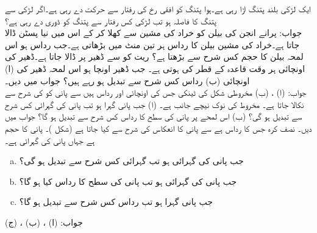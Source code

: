 ایک لڑکی  بلند پتنگ اڑا رہی ہے۔ہوا پتنگ کو افقی رخ  کی رفتار سے حرکت دے رہی ہے۔اگر لڑکی سے پتنگ کا فاصلہ  ہو تب لڑکی کس رفتار سے پتنگ کو ڈوری دے رہی ہے؟ \\
جواب:\quad {}
پرانے انجن کی بیلن کو خراد کی مشین سے کھلا کر کے اس میں نیا پسٹن ڈالا جاتا ہے۔خراد کی مشین بیلن کا رداس ہر تین منٹ میں  بڑھاتی ہے۔جب رداس  ہو اس لمحہ بیلن کا حجم کس شرح سے بڑھتا ہے؟
ریت کو  سے  ڈھیر  پر ڈالا جاتا ہے۔ڈھیر کی اونچائی ہر وقت قاعدہ کے قطر کی  ہوتی ہے۔ جب ڈھیر  اونچا ہو اس لمحہ ڈھیر کی (ا) اونچائی (ب) رداس کس شرح سے تبدیل ہو رہے ہیں؟  جواب  میں دیں۔ \\
جواب:\quad
(ا) ، (ب) 
مخروطی شکل کی ٹینکی جس کی اونچائی  اور رداس  ہیں سے پانی  کو  کی شرح سے نکالا جاتا ہے۔ مخروط کی نوک نیچے جانب ہے۔ (ا) جب پانی  گہرا ہو تب پانی کی گہرائی کس شرح سے تبدیل ہو گی؟ (ب) اس لمحے پر پانی کی سطح کا رداس کس شرح سے تبدیل ہو گا؟ جواب  میں دیں۔
نصف کرہ جس کا رداس  ہے سے پانی کا انعکاس  کی  شرح سے کیا جاتا ہے (شکل )۔ پانی کا حجم  ہے جہاں  پانی کی گہرائی ہے۔
%
\begin{enumerate}[a.]
\item
جب پانی کی گہرائی  ہو تب گہرائی کس شرح سے تبدیل ہو گی؟
\item
جب پانی کی گہرائی  ہو تب پانی کی سطح کا رداس کیا ہو گا؟
\item
جب پانی  گہرا ہو تب رداس کس شرح سے تبدیل ہو گا؟
\end{enumerate}
جواب:\quad
(ا) ، (ب) ، (ج) 
